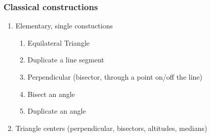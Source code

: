 \documentclass[12pt, oneside]{article}
\begin{document}
\subsubsection*{Classical constructions}
\begin{enumerate}
  \item Elementary, single constuctions
  \begin{enumerate}
    \item Equilateral Triangle
    \item Duplicate a line segment
    \item Perpendicular (bisector, through a point on/off the line)
    \item Bisect an angle
    \item Duplicate an angle
    \end{enumerate}
  \item Triangle centers (perpendicular, bisectors, altitudes, medians)
  \end{enumerate}
\end{document}
